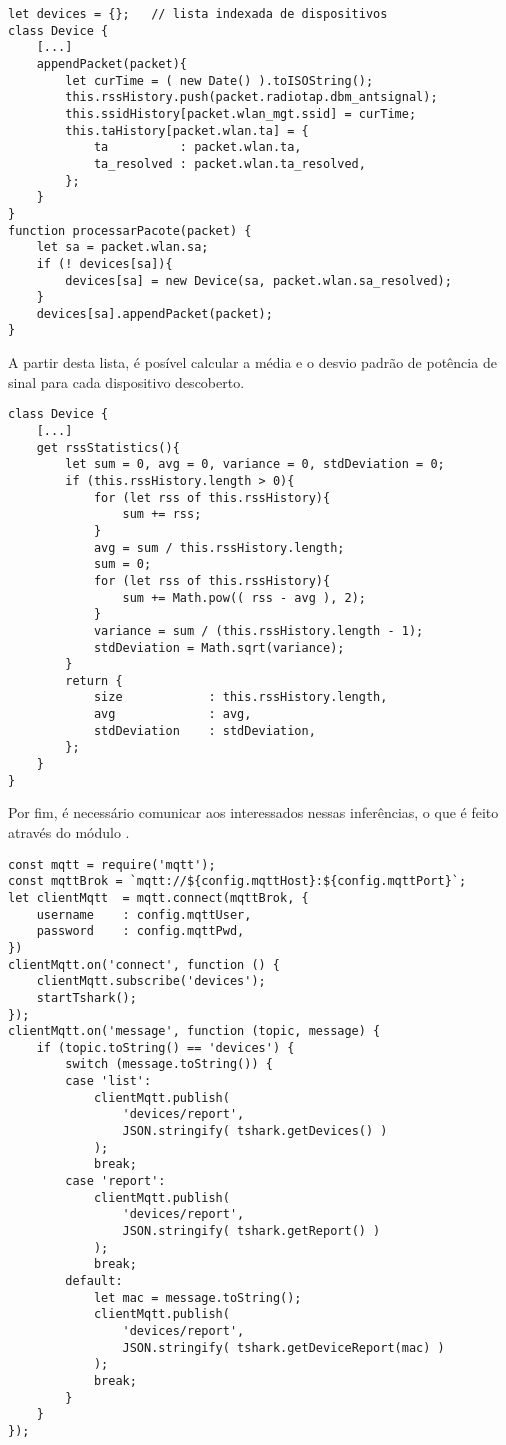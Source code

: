 \begin{lstlisting}
let devices = {};	// lista indexada de dispositivos
class Device {
	[...]
	appendPacket(packet){
		let curTime = ( new Date() ).toISOString();
		this.rssHistory.push(packet.radiotap.dbm_antsignal);
		this.ssidHistory[packet.wlan_mgt.ssid] = curTime;
		this.taHistory[packet.wlan.ta] = {
			ta			: packet.wlan.ta,
			ta_resolved	: packet.wlan.ta_resolved,
		};
	}
}
function processarPacote(packet) {
	let sa = packet.wlan.sa;
	if (! devices[sa]){
		devices[sa] = new Device(sa, packet.wlan.sa_resolved);
	}
	devices[sa].appendPacket(packet);
}
\end{lstlisting}

A partir desta lista, é posível calcular a média e o desvio padrão de potência de
sinal para cada dispositivo descoberto.

\begin{lstlisting}
class Device {
	[...]
	get rssStatistics(){
		let sum = 0, avg = 0, variance = 0, stdDeviation = 0;
		if (this.rssHistory.length > 0){
			for (let rss of this.rssHistory){
				sum += rss;
			}
			avg = sum / this.rssHistory.length;
			sum = 0;
			for (let rss of this.rssHistory){
				sum += Math.pow(( rss - avg ), 2);
			}
			variance = sum / (this.rssHistory.length - 1);
			stdDeviation = Math.sqrt(variance);
		}
		return {
			size			: this.rssHistory.length,
			avg				: avg,
			stdDeviation	: stdDeviation,
		};
	}
}
\end{lstlisting}


Por fim, é necessário comunicar aos interessados nessas inferências, o que é
feito através do módulo .


\begin{lstlisting}
const mqtt = require('mqtt');
const mqttBrok = `mqtt://${config.mqttHost}:${config.mqttPort}`;
let clientMqtt	= mqtt.connect(mqttBrok, {
	username	: config.mqttUser,
	password	: config.mqttPwd,
})
clientMqtt.on('connect', function () {
	clientMqtt.subscribe('devices');
	startTshark();
});
clientMqtt.on('message', function (topic, message) {
	if (topic.toString() == 'devices') {
		switch (message.toString()) {
		case 'list':
			clientMqtt.publish(
				'devices/report',
				JSON.stringify( tshark.getDevices() )
			);
			break;
		case 'report':
			clientMqtt.publish(
				'devices/report',
				JSON.stringify( tshark.getReport() )
			);
			break;
		default:
			let mac = message.toString();
			clientMqtt.publish(
				'devices/report',
				JSON.stringify( tshark.getDeviceReport(mac) )
			);
			break;
		}
	}
});
\end{lstlisting}

